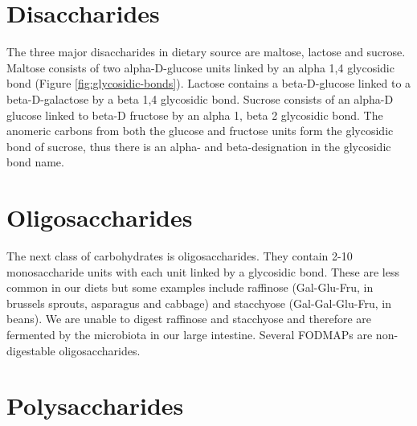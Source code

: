 \documentclass{tufte-handout}
\begin{document}
\section{Disaccharides}

The three major disaccharides in dietary source are maltose, lactose and sucrose. Maltose consists of two alpha-D-glucose units linked by an alpha 1,4 glycosidic bond (Figure \ref{fig:glycosidic-bonds}). Lactose contains a beta-D-glucose linked to a beta-D-galactose by a beta 1,4 glycosidic bond. Sucrose consists of an alpha-D glucose linked to beta-D fructose by an alpha 1, beta 2 glycosidic bond. The anomeric carbons from both the glucose and fructose units form the glycosidic bond of sucrose, thus there is an alpha- and beta-designation in the glycosidic bond name.

\section{Oligosaccharides}

The next class of carbohydrates is oligosaccharides. They contain 2-10 monosaccharide units with each unit linked by a glycosidic bond.  These are less common in our diets but some examples include raffinose (Gal-Glu-Fru, in brussels sprouts, asparagus and cabbage) and stacchyose (Gal-Gal-Glu-Fru, in beans).  We are unable to digest raffinose and stacchyose and therefore are fermented by the microbiota in our large intestine.   Several FODMAPs are non-digestable oligosaccharides.

\section{Polysaccharides}
\end{document}
